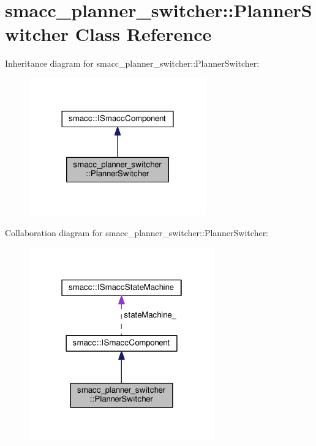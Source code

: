 \hypertarget{classsmacc__planner__switcher_1_1PlannerSwitcher}{\section{smacc\-\_\-planner\-\_\-switcher\-:\-:Planner\-Switcher Class Reference}
\label{classsmacc__planner__switcher_1_1PlannerSwitcher}
}


Inheritance diagram for smacc\-\_\-planner\-\_\-switcher\-:\-:Planner\-Switcher\-:
\nopagebreak
\begin{figure}[H]
\begin{center}
\leavevmode
\includegraphics[width=216pt]{classsmacc__planner__switcher_1_1PlannerSwitcher__inherit__graph}
\end{center}
\end{figure}


Collaboration diagram for smacc\-\_\-planner\-\_\-switcher\-:\-:Planner\-Switcher\-:
\nopagebreak
\begin{figure}[H]
\begin{center}
\leavevmode
\includegraphics[width=226pt]{classsmacc__planner__switcher_1_1PlannerSwitcher__coll__graph}
\end{center}
\end{figure}

